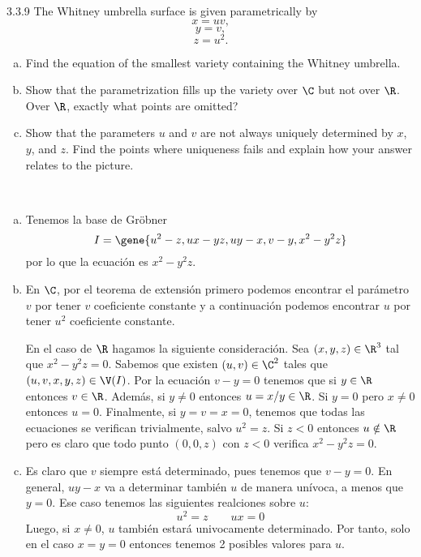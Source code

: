 \documentclass[twoside]{article}
\begin{document}
\begin{ejercicio}{3.3.9}
The Whitney umbrella surface is given parametrically by
\[x = uv,\]
\[y = v,\]
\[z = u^2.\]
\begin{enumerate}[a.]
\item Find the equation of the smallest variety containing the Whitney umbrella.
\item Show that the parametrization fills up the variety over $\C$ but not over $\R$. Over $\R$,
exactly what points are omitted?
\item Show that the parameters $u$ and $v$ are not always uniquely determined by $x$, $y$, and $z$.
Find the points where uniqueness fails and explain how your answer relates to the
picture.
\end{enumerate}
\end{ejercicio}
\begin{solucion}\
\begin{enumerate}[a.]
\item Tenemos la base de Gröbner 
\[
I =\gene{u^2 - z, ux - yz, uy - x, v - y, x^2 - y^2z}
\]
por lo que la ecuación es $x^2-y^2z$. 
\item En $\C$, por el teorema de extensión primero podemos encontrar el parámetro $v$ por tener $v$ coeficiente constante y a continuación podemos encontrar $u$ por tener $u^2$ coeficiente constante. 

En el caso de $\R$ hagamos la siguiente consideración. Sea $(x,y,z)\in \R^3$ tal que $x^2-y^2z=0$. Sabemos que existen $(u,v)\in\C^2$ tales que $(u,v,x,y,z)\in \V(I)$. Por la ecuación $v-y=0$ tenemos que si $y\in \R$ entonces $v\in \R$. Además, si $y\neq 0$ entonces $u=x/y\in \R$. Si $y=0$ pero $x\neq 0$ entonces $u=0$. Finalmente, si $y=v=x=0$, tenemos que todas las ecuaciones se verifican trivialmente, salvo $u^2=z$. Si $z<0$ entonces $u \notin \R$ pero es claro que todo punto $(0,0,z)$ con $z<0$ verifica $x^2-y^2z=0$.

\item Es claro que $v$ siempre está determinado, pues tenemos que $v-y=0$. En general, $uy-x$ va a determinar también $u$ de manera unívoca, a menos que $y=0$. Ese caso tenemos las siguientes realciones sobre $u$:
$$
u^2 = z \qquad ux = 0
$$
Luego, si $x\neq 0$, $u$ también estará univocamente determinado. Por tanto, solo en el caso $x=y=0$ entonces tenemos 2 posibles valores para $u$.
\end{enumerate}
\end{solucion}


\newpage
\end{document}
